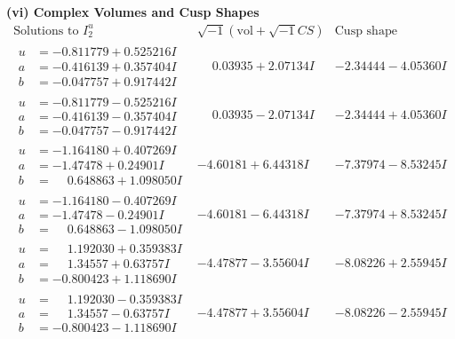 \documentclass[1p]{elsarticle_modified}
\theoremstyle{definition}
\newcommand{\I}{\sqrt{-1}}
\begin{document}
\newpage\flushleft \textbf{(vi) Complex Volumes and Cusp Shapes}
$$\begin{array}{c|c|c}  
\text{Solutions to }I^u_{2}& \I (\text{vol} + \sqrt{-1}CS) & \text{Cusp shape}\\
 \hline 
\begin{aligned}
u &= -0.811779 + 0.525216 I \\
a &= -0.416139 + 0.357404 I \\
b &= -0.047757 + 0.917442 I\end{aligned}
 & \phantom{-}0.03935 + 2.07134 I & -2.34444 - 4.05360 I \\ \hline\begin{aligned}
u &= -0.811779 - 0.525216 I \\
a &= -0.416139 - 0.357404 I \\
b &= -0.047757 - 0.917442 I\end{aligned}
 & \phantom{-}0.03935 - 2.07134 I & -2.34444 + 4.05360 I \\ \hline\begin{aligned}
u &= -1.164180 + 0.407269 I \\
a &= -1.47478 + 0.24901 I \\
b &= \phantom{-}0.648863 + 1.098050 I\end{aligned}
 & -4.60181 + 6.44318 I & -7.37974 - 8.53245 I \\ \hline\begin{aligned}
u &= -1.164180 - 0.407269 I \\
a &= -1.47478 - 0.24901 I \\
b &= \phantom{-}0.648863 - 1.098050 I\end{aligned}
 & -4.60181 - 6.44318 I & -7.37974 + 8.53245 I \\ \hline\begin{aligned}
u &= \phantom{-}1.192030 + 0.359383 I \\
a &= \phantom{-}1.34557 + 0.63757 I \\
b &= -0.800423 + 1.118690 I\end{aligned}
 & -4.47877 - 3.55604 I & -8.08226 + 2.55945 I \\ \hline\begin{aligned}
u &= \phantom{-}1.192030 - 0.359383 I \\
a &= \phantom{-}1.34557 - 0.63757 I \\
b &= -0.800423 - 1.118690 I\end{aligned}
 & -4.47877 + 3.55604 I & -8.08226 - 2.55945 I \\ \hline\begin{aligned}

\end{aligned}
\end{array}$$
\end{document}
